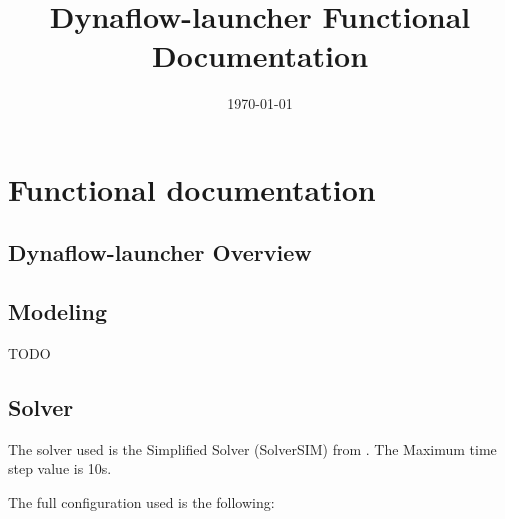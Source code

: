 \documentclass[a4paper, 12pt]{report}
\begin{document}
\title{Dynaflow-launcher Functional Documentation}
\date\today

\maketitle
\tableofcontents

\chapter{Functional documentation}

\section[Dynaflow-launcher Overview]{Dynaflow-launcher Overview}

\section{Modeling}

TODO
\section{Solver}

The solver used is the Simplified Solver (SolverSIM) from \Dynawo.
The Maximum time step value is 10s.

The full configuration used is the following:


\end{document}
